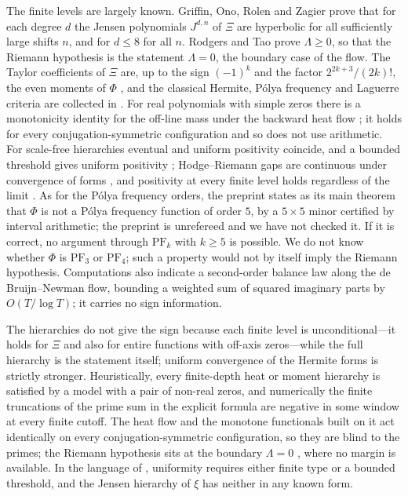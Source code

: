 \documentclass[11pt]{amsart}
\theoremstyle{definition}
\theoremstyle{remark}
\numberwithin{equation}{section}
\begin{document}
The finite levels are largely known. Griffin, Ono, Rolen and Zagier \cite{GORZ2019} prove that for
each degree $d$ the Jensen polynomials $J^{d,n}$ of $\Xi$ are hyperbolic for all sufficiently large
shifts $n$, and for $d\le8$ for all $n$. Rodgers and Tao \cite{RodgersTao2020} prove $\Lambda\ge0$,
so that the Riemann hypothesis is the statement $\Lambda=0$, the boundary case of the flow. The
Taylor coefficients of $\Xi$ are, up to the sign $(-1)^k$ and the factor $2^{2k+3}/(2k)!$, the
even moments of $\Phi$ \cite[\S3]{P14}, and the classical Hermite, P\'olya frequency and Laguerre
criteria are collected in \cite{P14}. For real polynomials with simple zeros there is a
monotonicity identity for the off-line mass under the backward heat flow \cite[Theorem~2.1]{P13};
it holds for every conjugation-symmetric configuration and so does not use arithmetic. For
scale-free hierarchies eventual and uniform positivity coincide, and a bounded threshold gives
uniform positivity \cite[Theorem~3.1]{P15}; Hodge--Riemann gaps are continuous under convergence
of forms \cite[Lemma~8.2]{P15}, and positivity at every finite level holds regardless of the limit
\cite[Corollary~8.3]{P15}. As for the P\'olya frequency orders, the preprint
\cite{Michalowski2026} states as its main theorem that $\Phi$ is not a P\'olya frequency function
of order $5$, by a $5\times5$ minor certified by interval arithmetic; the preprint is unrefereed
and we have not checked it. If it is correct, no argument through $\mathrm{PF}_k$ with $k\ge5$ is
possible. We do not know whether $\Phi$ is $\mathrm{PF}_3$ or $\mathrm{PF}_4$; such a property
would not by itself imply the Riemann hypothesis. Computations also indicate a second-order
balance law along the de Bruijn--Newman flow, bounding a weighted sum of squared imaginary parts
by $O(T/\log T)$; it carries no sign information.

The hierarchies do not give the sign because each finite level is unconditional---it holds for
$\Xi$ and also for entire functions with off-axis zeros---while the full hierarchy is the
statement itself; uniform convergence of the Hermite forms is strictly stronger. Heuristically,
every finite-depth heat or moment hierarchy is satisfied by a model with a pair of non-real zeros,
and numerically the finite truncations of the prime sum in the explicit formula are negative in
some window at every finite cutoff. The heat flow and the monotone functionals built on it act
identically on every conjugation-symmetric configuration, so they are blind to the primes; the
Riemann hypothesis sits at the boundary $\Lambda=0$ \cite{RodgersTao2020}, where no margin is
available. In the language of \cite{P15}, uniformity requires either finite type or a bounded
threshold, and the Jensen hierarchy of $\xi$ has neither in any known form.
\end{document}
